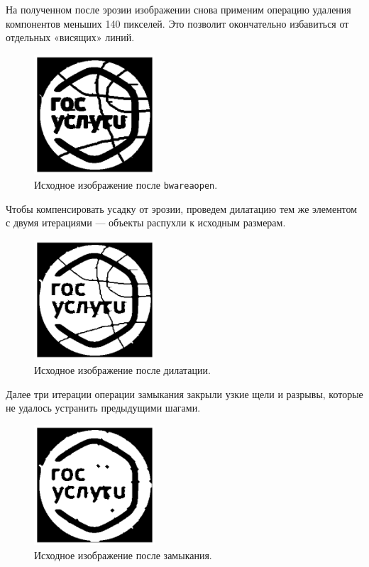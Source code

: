 \documentclass[a4paper,12pt]{article}
\begin{document}
На полученном после эрозии изображении снова применим операцию удаления компонентов меньших 140 пикселей. Это позволит окончательно избавиться от отдельных «висящих» линий.

\begin{figure}[H]
    \centering
    \includegraphics[width=0.4\textwidth]{result/1_beware_out.png}
    \caption{Исходное изображение после \texttt{bwareaopen}.}
\end{figure}

Чтобы компенсировать усадку от эрозии, проведем дилатацию тем же элементом с двумя итерациями — объекты распухли к исходным размерам.

\begin{figure}[H]
    \centering
    \includegraphics[width=0.4\textwidth]{result/1_dilation.png}
    \caption{Исходное изображение после дилатации.}
\end{figure}

Далее три итерации операции замыкания закрыли узкие щели и разрывы, которые не удалось устранить предыдущими шагами.

\begin{figure}[H]
    \centering
    \includegraphics[width=0.4\textwidth]{result/1_close.png}
    \caption{Исходное изображение после замыкания.}
\end{figure}
\end{document}
